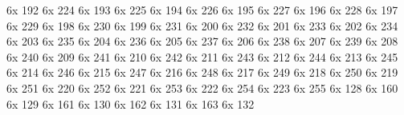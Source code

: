 \characterdef \CYRA         6x  192
\characterdef \cyra         6x  224
\characterdef \CYRB         6x  193
\characterdef \cyrb         6x  225
\characterdef \CYRV         6x  194
\characterdef \cyrv         6x  226
\characterdef \CYRG         6x  195
\characterdef \cyrg         6x  227
\characterdef \CYRD         6x  196
\characterdef \cyrd         6x  228
\characterdef \CYRE         6x  197
\characterdef \cyre         6x  229
\characterdef \CYRZH        6x  198
\characterdef \cyrzh        6x  230
\characterdef \CYRZ         6x  199
\characterdef \cyrz         6x  231
\characterdef \CYRI         6x  200
\characterdef \cyri         6x  232
\characterdef \CYRISHRT     6x  201
\characterdef \cyrishrt     6x  233
\characterdef \CYRK         6x  202
\characterdef \cyrk         6x  234
\characterdef \CYRL         6x  203
\characterdef \cyrl         6x  235
\characterdef \CYRM         6x  204
\characterdef \cyrm         6x  236
\characterdef \CYRN         6x  205
\characterdef \cyrn         6x  237
\characterdef \CYRO         6x  206
\characterdef \cyro         6x  238
\characterdef \CYRP         6x  207
\characterdef \cyrp         6x  239
\characterdef \CYRR         6x  208
\characterdef \cyrr         6x  240
\characterdef \CYRS         6x  209
\characterdef \cyrs         6x  241
\characterdef \CYRT         6x  210
\characterdef \cyrt         6x  242
\characterdef \CYRU         6x  211
\characterdef \cyru         6x  243
\characterdef \CYRF         6x  212
\characterdef \cyrf         6x  244
\characterdef \CYRH         6x  213
\characterdef \cyrh         6x  245
\characterdef \CYRC         6x  214
\characterdef \cyrc         6x  246
\characterdef \CYRCH        6x  215
\characterdef \cyrch        6x  247
\characterdef \CYRSH        6x  216
\characterdef \cyrsh        6x  248
\characterdef \CYRSHCH      6x  217
\characterdef \cyrshch      6x  249
\characterdef \CYRHRDSN     6x  218
\characterdef \cyrhrdsn     6x  250
\characterdef \CYRERY       6x  219
\characterdef \cyrery       6x  251
\characterdef \CYRSFTSN     6x  220
\characterdef \cyrsftsn     6x  252
\characterdef \CYREREV      6x  221
\characterdef \cyrerev      6x  253
\characterdef \CYRYU        6x  222
\characterdef \cyryu        6x  254
\characterdef \CYRYA        6x  223
\characterdef \cyrya        6x  255
\characterdef \CYRGUP       6x  128
\characterdef \cyrgup       6x  160
\characterdef \CYRGHCRS     6x  129
\characterdef \cyrghcrs     6x  161
\characterdef \CYRGDSC      6x  130
\characterdef \cyrgdsc      6x  162
\characterdef \CYRGHK       6x  131
\characterdef \cyrghk       6x  163
\characterdef \CYRSHHA      6x  132
